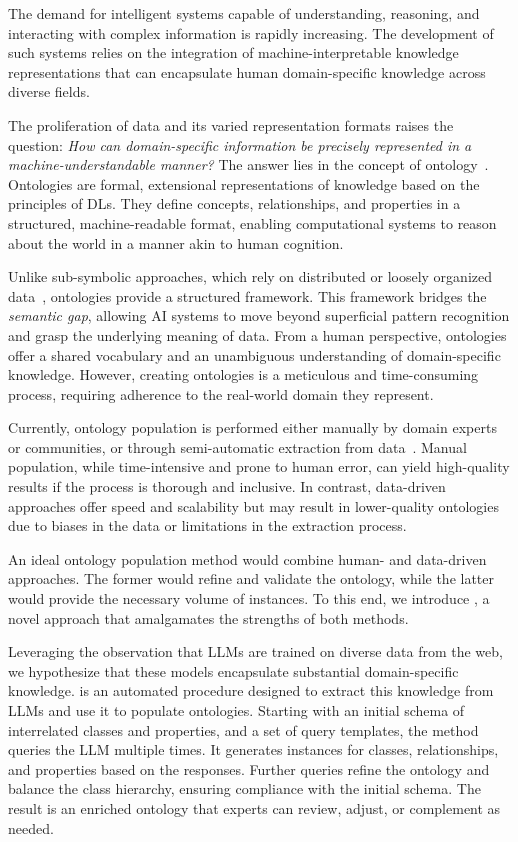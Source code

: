 The demand for intelligent systems capable of understanding, reasoning, and interacting with complex information is rapidly increasing.
%
The development of such systems relies on the integration of machine-interpretable knowledge representations that can encapsulate human domain-specific knowledge across diverse fields.


The proliferation of data and its varied representation formats raises the question: \emph{How can domain-specific information be precisely represented in a machine-understandable manner?}
%
The answer lies in the concept of ontology~\cite{DBLP:books/daglib/p/Grimm10}.
%
Ontologies are formal, extensional representations of knowledge based on the principles of \glspl{DL}.
%
They define concepts, relationships, and properties in a structured, machine-readable format, enabling computational systems to reason about the world in a manner akin to human cognition.


Unlike sub-symbolic approaches, which rely on distributed or loosely organized data~\cite{DBLP:journals/csur/CiattoSAMO24}, ontologies provide a structured framework.
%
This framework bridges the \emph{semantic gap}, allowing \gls{AI} systems to move beyond superficial pattern recognition and grasp the underlying meaning of data.
%
From a human perspective, ontologies offer a shared vocabulary and an unambiguous understanding of domain-specific knowledge.
%
However, creating ontologies is a meticulous and time-consuming process, requiring adherence to the real-world domain they represent.


Currently, ontology population is performed either manually by domain experts or communities, or through semi-automatic extraction from data~\cite{petasis-2011}.
%
Manual population, while time-intensive and prone to human error, can yield high-quality results if the process is thorough and inclusive.
%
In contrast, data-driven approaches offer speed and scalability but may result in lower-quality ontologies due to biases in the data or limitations in the extraction process.


An ideal ontology population method would combine human- and data-driven approaches.
%
The former would refine and validate the ontology, while the latter would provide the necessary volume of instances.
%
To this end, we introduce \llmfkg, a novel approach that amalgamates the strengths of both methods.


Leveraging the observation that \glspl{LLM} are trained on diverse data from the web, we hypothesize that these models encapsulate substantial domain-specific knowledge.
%
\llmfkg{} is an automated procedure designed to extract this knowledge from \glspl{LLM} and use it to populate ontologies.
%
Starting with an initial schema of interrelated classes and properties, and a set of query templates, the method queries the \gls{LLM} multiple times.
%
It generates instances for classes, relationships, and properties based on the responses.
%
Further queries refine the ontology and balance the class hierarchy, ensuring compliance with the initial schema.
%
The result is an enriched ontology that experts can review, adjust, or complement as needed.


